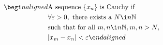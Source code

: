 \documentclass[preview]{standalone}
\begin{document}
\begin{align*}
\begi n {alig n ed}&\text{A  sequence  } \{ x_n \} \text{ is Cauchy if } \\ &\forall  \varepsilon  > 0, \text{ there exists a }  N  \i n   \mathbb{N}  \\ &\text{such that for all }  m ,  n  \i n   \mathbb{N} ,  m ,  n  >  N , \\ &| x_m - x_n | <  \varepsilon \e n d{alig n ed}
\end{align*}
\end{document}
